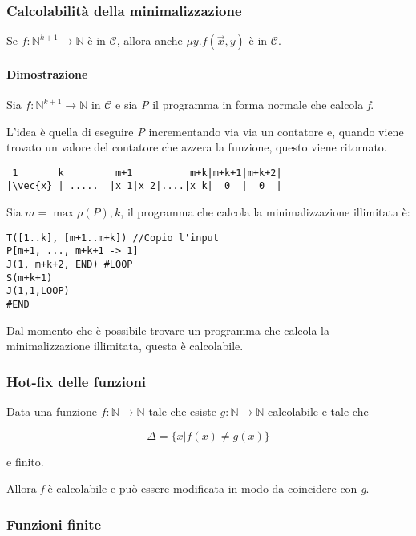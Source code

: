 \subsubsection{Calcolabilità della minimalizzazione}\label{calcolabitliuxe0-della-minimalizzazione}

Se $ f : \mathbb{N}^{k+1} \rightarrow \mathbb{N} $ è in $ \mathcal{C} $, allora anche
$\mu y.f(\vec{x},y)$ è in $ \mathcal{C} $.

\paragraph{Dimostrazione}\label{dimostrazione}

Sia  $ f : \mathbb{N}^{k+1} \rightarrow \mathbb{N} $ in $ \mathcal{C} $ e sia \textit{P} il programma in
forma normale che calcola \textit{f}.

L'idea è quella di eseguire \emph{P} incrementando via via un contatore e, quando viene trovato un valore del contatore che azzera la funzione, questo viene ritornato.

\begin{verbatim}
 1       k         m+1          m+k|m+k+1|m+k+2|
|\vec{x} | .....  |x_1|x_2|....|x_k|  0  |  0  |
\end{verbatim}

Sia $m = \max{\rho(P), k }$, il programma che calcola la minimalizzazione illimitata è:

\begin{lstlisting}[language=URM]
T([1..k], [m+1..m+k]) //Copio l'input
P[m+1, ..., m+k+1 -> 1]
J(1, m+k+2, END) #LOOP
S(m+k+1)
J(1,1,LOOP)
#END
\end{lstlisting}

Dal momento che è possibile trovare un programma che calcola la
minimalizzazione illimitata, questa è calcolabile.

\subsubsection{Hot-fix delle funzioni} \label{hotfix}
Data una funzione  $ f : \mathbb{N} \rightarrow \mathbb{N} $ tale che esiste  $ g : \mathbb{N} \rightarrow \mathbb{N} $ calcolabile e tale che

$$
\Delta = \{ x | f(x) \neq g(x) \}
$$

e finito.

Allora \emph{f} è calcolabile e può essere modificata in modo da
coincidere con \emph{g}.

\subsubsection{Funzioni finite}\label{funizioni-finite}

